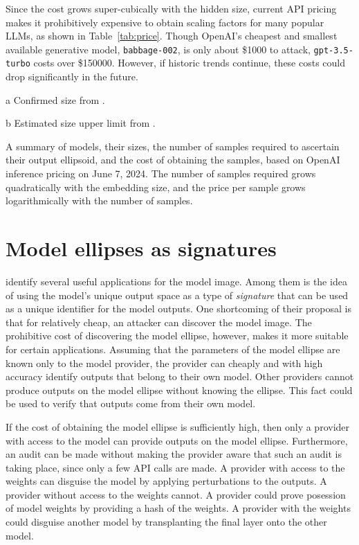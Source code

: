 \documentclass{article}
\begin{document}
Since the cost grows super-cubically with the hidden size, 
current API pricing makes it prohibitively expensive to obtain scaling factors for many popular LLMs, as shown in Table~\ref{tab:price}.
Though OpenAI's cheapest and smallest available generative model, \texttt{babbage-002}, is only about \$\num{1000} to attack, \texttt{gpt-3.5-turbo} costs over \$\num{150 000}.
However, if historic trends continue, these costs could drop significantly in the future.

\begin{table}
  \centering
  \small
  \begin{threeparttable}
  
    \begin{tablenotes}
    \item[a] Confirmed size from \citet{Carlini2024StealingPO}.
    \item[b] Estimated size upper limit from \citet{Finlayson2024LogitsOA}.
    \end{tablenotes}
  \end{threeparttable}
  \caption{
    A summary of models, their sizes, the number of samples required to ascertain their output ellipsoid, and the cost of obtaining the samples, based on OpenAI inference pricing on June 7, 2024. The number of samples required grows quadratically with the embedding size, and the price per sample grows logarithmically with the number of samples.
  }
  \label{tab:price}
\end{table}

\section{Model ellipses as signatures}

\citet{Finlayson2024LogitsOA} identify several useful applications for the model image. 
Among them is the idea of using the model's unique output space as a type of \textit{signature}
that can be used as a unique identifier for the model outputs.
One shortcoming of their proposal is that for relatively cheap,
an attacker can discover the model image. 
The prohibitive cost of discovering the model ellipse, however, makes it more suitable for certain applications.
Assuming that the parameters of the model ellipse are known only to the model provider, the provider can cheaply and with high accuracy identify outputs that belong to their own model.
Other providers cannot produce outputs on the model ellipse without knowing the ellipse.
This fact could be used to verify that outputs come from their own model.

If the cost of obtaining the model ellipse is sufficiently high,
then only a provider with access to the model can provide outputs on the model ellipse.
Furthermore, an audit can be made without making the provider aware that such an audit is taking place, since only a few API calls are made.
A provider with access to the weights can disguise the model by applying perturbations to the outputs.
A provider without access to the weights cannot.
A provider could prove posession of model weights by providing a hash of the weights.
A provider with the weights could disguise another model by transplanting the final layer onto the other model.



\end{document}
